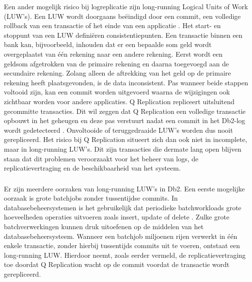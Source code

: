 Een ander mogelijk risico bij logreplicatie zijn long-running Logical Units of Work (LUW's).
Een LUW wordt doorgaans beëindigd door een commit, een volledige rollback van een transactie of het einde van een applicatie \autocite{ibm_2026_db2_unit_of_work}.
Het start- en stoppunt van een LUW definiëren consistentiepunten.
Een transactie binnen een bank kan, bijvoorbeeld, inhouden dat er een bepaalde som geld wordt overgeplaatst van één rekening naar een andere rekening.
Eerst wordt een geldsom afgetrokken van de primaire rekening en daarna toegevoegd aan de secundaire rekening.
Zolang alleen de aftrekking van het geld op de primaire rekening heeft plaatsgevonden, is de data inconsistent.
Pas wanneer beide stappen voltooid zijn, kan een commit worden uitgevoerd waarna de wijzigingen ook zichtbaar worden voor andere applicaties.
Q Replication repliceert uitsluitend gecommitte transacties.
Dit wil zeggen dat Q Replication een volledige transactie opbouwt in het geheugen en deze pas verstuurt nadat een commit in het Db2-log wordt gedetecteerd \autocite{chatterjee_2010_ibm_infosphere_replication_server}.
Onvoltooide of teruggedraaide LUW's worden dus nooit gerepliceerd.
Het risico bij Q Replication situeert zich dan ook niet in incomplete, maar in long-running LUW's.
Dit zijn transacties die dermate lang open blijven staan dat dit problemen veroorzaakt voor het beheer van logs, de replicatievertraging en de beschikbaarheid van het systeem.

\subsubsection{}
\label{sec:asynchrone-log-replicatie-oorzaken-long-running-logical-units-of-work}

Er zijn meerdere oorzaken van long-running LUW's in Db2.
Een eerste mogelijke oorzaak is grote batchjobs zonder tussentijdse commits.
In databasebeheersystemen is het gebruikelijk dat periodieke batchworkloads grote hoeveelheden operaties uitvoeren zoals insert, update of delete \autocite{ibm_2010_mainframe_batch_online_transaction_processing}.
Zulke grote batchverwerkingen kunnen druk uitoefenen op de middelen van het databasebeheersysteem.
Wanneer een batchjob miljoenen rijen verwerkt in één enkele transactie, zonder hierbij tussentijds commits uit te voeren, ontstaat een long-running LUW.
Hierdoor neemt, zoals eerder vermeld, de replicatievertraging toe doordat Q Replication wacht op de commit voordat de transactie wordt gerepliceerd.

